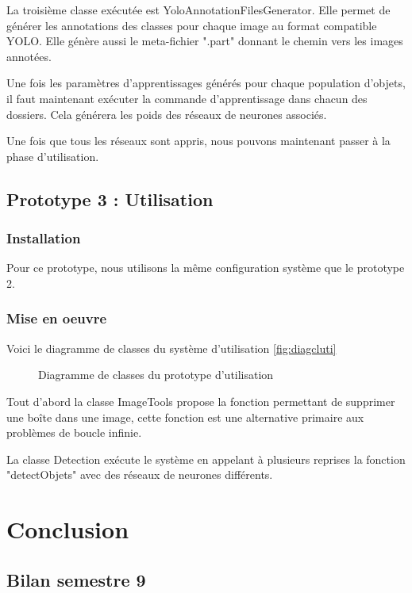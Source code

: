 \documentclass[debug,nodate,hideweeklyreports]{polytech/polytech}
\begin{document}
La troisième classe exécutée est YoloAnnotationFilesGenerator. Elle permet de générer les annotations des classes pour chaque image au format compatible YOLO. Elle génère aussi le meta-fichier ".part" donnant le chemin vers les images annotées.

Une fois les paramètres d'apprentissages générés pour chaque population d'objets, il faut maintenant exécuter la commande d'apprentissage dans chacun des dossiers. Cela générera les poids des réseaux de neurones associés.

Une fois que tous les réseaux sont appris, nous pouvons maintenant passer à la phase d'utilisation.

\section{Prototype 3 : Utilisation}

\subsection{Installation}

Pour ce prototype, nous utilisons la même configuration système que le prototype 2.

\subsection{Mise en oeuvre}

Voici le diagramme de classes du système d'utilisation \autoref{fig:diagcluti}

\begin{figure}
  \caption{Diagramme de classes du prototype d'utilisation}
  \label{fig:diagcluti}
\end{figure}

Tout d'abord la classe ImageTools propose la fonction permettant de supprimer une boîte dans une image, cette fonction est une alternative primaire aux problèmes de boucle infinie.

La classe Detection exécute le système en appelant à plusieurs reprises la fonction "detectObjets" avec des réseaux de neurones différents.

\chapter{Conclusion}

\section{Bilan semestre 9}
\end{document}
